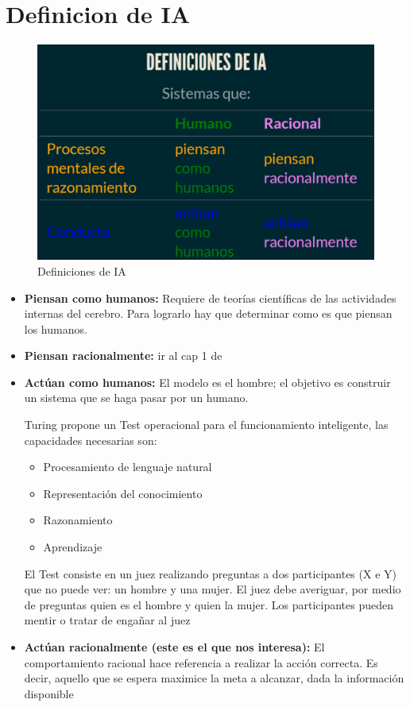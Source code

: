 \section{Definicion de IA}

\begin{figure}
  \centering
  \includegraphics[width=16cm, scale=1]{Images/Imagenes/cuadro1.png}
  \caption{Definiciones de IA}
  \label{fig:marcado}
\end{figure}

\begin{itemize}
  \item \textbf{Piensan como humanos:} Requiere de teorías científicas de las actividades internas del cerebro. Para lograrlo hay que determinar como es que piensan los humanos.
  \item \textbf{Piensan racionalmente:} ir al cap 1 de \cite{sabharwal2011s}
  \item \textbf{Actúan como humanos: }El modelo es el hombre; el objetivo es construir un sistema que se haga pasar por un humano.
  
  Turing propone un Test operacional para el funcionamiento inteligente, las capacidades necesarias son:
  \begin{itemize}
    \item Procesamiento de lenguaje natural
    \item Representación del conocimiento
    \item Razonamiento
    \item Aprendizaje
  \end{itemize}
  El Test consiste en un juez realizando preguntas a dos participantes (X e Y) que no puede ver: un hombre y una mujer. El juez debe averiguar, por medio de preguntas quien es el hombre y quien la mujer. Los participantes pueden mentir o tratar de engañar al juez
  \item \textbf{Actúan racionalmente (este es el que nos interesa):} El comportamiento racional hace referencia a realizar la acción correcta. Es decir, aquello que se espera maximice la meta a alcanzar, dada la información disponible
\end{itemize}

